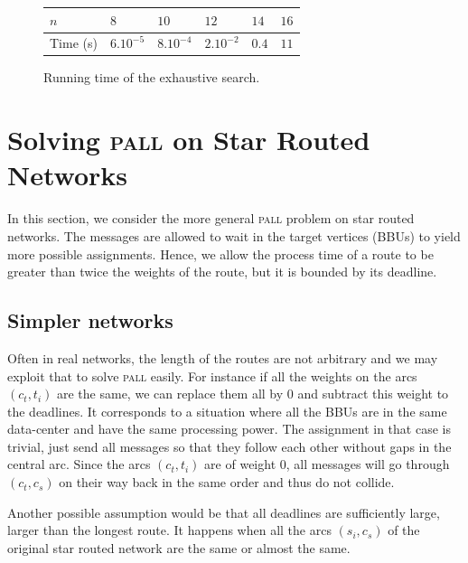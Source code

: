\documentclass[10pt, conference, letterpaper]{IEEEtran}
\newcommand\pall{\textsc{pall}\xspace}
\begin{document}
      \begin{figure}[h]
         \begin{center}
         \begin{tabularx}{0.5\textwidth}{|l|X|X|X|X|X|}
    \hline
   $n$ & $8$ & $10$& $12$&$14$& $16$\\
    \hline
   Time (s) & $6.10^{-5}$&$8.10^{-4}$&$2.10^{-2}$& $0.4$& $11$\\
    \hline
      \end{tabularx}
      \end{center}
      \caption{Running time of the exhaustive search.}
      \label{fig:table}
      \end{figure}
      
         \section{Solving \pall on Star Routed Networks}\label{sec:PALL}
    
    In this section, we consider the more general \pall problem on star routed networks. The messages are allowed to wait in the target vertices (BBUs) to yield more possible assignments. Hence, we allow the process time of a route to be greater than twice the weights of the route, but it is bounded by its deadline.

	\subsection{Simpler networks}
		
		
	Often in real networks, the length of the routes are not arbitrary and we may exploit that to solve \pall easily. For instance if all the weights on the arcs $(c_t,t_i)$ are the same, we can replace them all by $0$ and subtract this weight to the deadlines. It corresponds to a situation where all the BBUs are in the same data-center and have the same processing power. The assignment in that case is trivial, just send all messages so that they follow each other without gaps in the central arc. Since the arcs $(c_t,t_i)$ are of weight $0$, all messages will go through $(c_t,c_s)$ on their way back in the same order and thus do not collide. 
	
	Another possible assumption would be that all deadlines are sufficiently large, larger than the longest route.
	It happens when all the arcs $(s_i,c_s)$ of the original star routed network are the same or almost the same.
		
\end{document}
